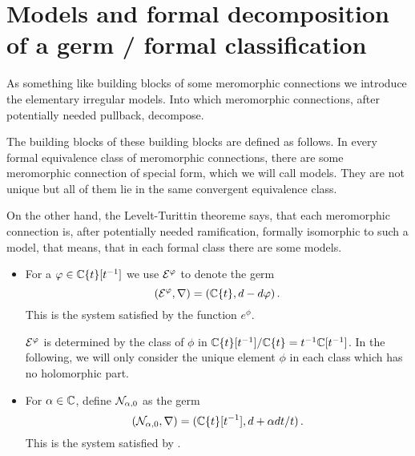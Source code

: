 \section{Models and formal decomposition of a germ / formal classification}
\begin{paracol}{2}
\switchcolumn[0]\noindent
  As something like building blocks of some meromorphic connections we introduce
  the elementary irregular models. Into which meromorphic connections, after
  potentially needed pullback, decompose.

  The building blocks of these building blocks are defined as follows.
\switchcolumn[1]\noindent
  In every formal equivalence class of meromorphic connections, there are some
  meromorphic connection of special form, which we will call models. They are
  not unique but all of them lie in the same convergent equivalence class.

  On the other hand, the Levelt-Turittin theoreme says, that  each meromorphic
  connection is, after potentially needed ramification, formally isomorphic to
  such a model, that means, that in each formal class there are some models.
\end{paracol}
\begin{defn}
  \begin{itemize}
    \item For a $\varphi\in\mathbb{C}\{t\}[t^{-1}]$ we use $\mathcal{E}^{\varphi}$ to denote the germ
      \[
        (\mathcal{E}^{\varphi},\nabla)=(\mathbb{C}\{t\},d-d\varphi)\,.
      \]
      This is the system satisfied by the function $e^\phi$.
      \begin{cor}
        $\mathcal{E}^\varphi$ is determined by the class of $\phi$ in
        $\mathbb{C}\{t\}[t^{-1}]/\mathbb{C}\{t\}=t^{-1}\mathbb{C}[t^{-1}]$. In the following, we will
        only consider the unique element $\phi$ in each class which has no
        holomorphic part.
      \end{cor}
    \item For $\alpha\in\mathbb{C}$, define $\mathcal{N}_{\alpha,0}$ as the germ
      \[
        (\mathcal{N}_{\alpha,0},\nabla)=(\mathbb{C}\{t\}[t^{-1}],d+\alpha dt/t)\,.
      \]
      This is the system satisfied by \TODO{}.
  \end{itemize}
\end{defn}

